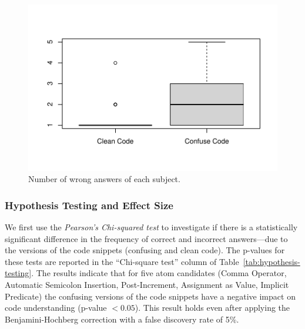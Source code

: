 \begin{figure}[htb!]
\noindent
 \centering
 \includegraphics[width=\columnwidth]{images/wrong-answers-plot-1.pdf}
 \caption{Number of wrong answers of each subject.}
 \label{fig:boxplotcorrectness}
 \end{figure}


\subsubsection*{Hypothesis Testing and Effect Size}

We first use the \emph{Pearson's Chi-squared test}
to investigate if there is a statistically significant difference in the frequency of correct and incorrect answers---due to the versions of the code snippets (confusing and clean code). The p-values for these tests are reported in the ``Chi-square test'' column of Table~\ref{tab:hypothesis-testing}. The results indicate that for five atom candidates (Comma Operator, Automatic Semicolon Insertion, Post-Increment, Assignment as Value, Implicit Predicate) the confusing versions of the code snippets have a negative impact on code understanding (p-value $< 0.05$). This result holds even after applying the Benjamini-Hochberg correction with a false discovery rate of 5\%. 

